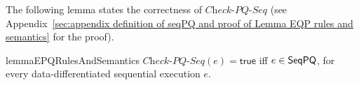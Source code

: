 %
%
%
%
%
%
%
%
%

The following lemma states the correctness of $\textit{Check-PQ-Seq}$ (see Appendix~\ref{sec:appendix definition of seqPQ and proof of Lemma EQP rules and semantics} for the proof).

\begin{restatable}{lemma}{EPQRulesAndSemantics}
\label{lemma:EPQ rules and semantics}
$\textit{Check-PQ-Seq}(e)=\mathsf{true}$ iff $e\in \mathsf{SeqPQ}$, for every data-differentiated sequential execution $e$.
\end{restatable}

%


